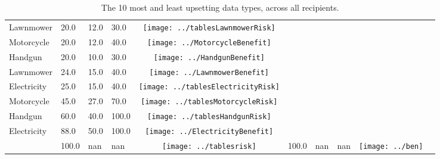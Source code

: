 \begin{table}[t]
\begin{center}
\begin{tabular}{| p{2cm} | p{1cm} | p{1cm} | p{1cm} | c | p{2cm} | p{1cm} | p{1cm} | p{1cm} | c |}
Lawnmower & 20.0 & 12.0 & 30.0 & \texttt{[image: ../tablesLawnmowerRisk]} \\ 
Motorcycle & 20.0 & 12.0 & 40.0 & \texttt{[image: ../MotorcycleBenefit]} \\ 
Handgun & 20.0 & 10.0 & 30.0 & \texttt{[image: ../HandgunBenefit]} \\ 
Lawnmower & 24.0 & 15.0 & 40.0 & \texttt{[image: ../LawnmowerBenefit]} \\ 
Electricity & 25.0 & 15.0 & 40.0 & \texttt{[image: ../tablesElectricityRisk]} \\ 
Motorcycle & 45.0 & 27.0 & 70.0 & \texttt{[image: ../tablesMotorcycleRisk]} \\ 
Handgun & 60.0 & 40.0 & 100.0 & \texttt{[image: ../tablesHandgunRisk]} \\ 
Electricity & 88.0 & 50.0 & 100.0 & \texttt{[image: ../ElectricityBenefit]} \\ 
 & 100.0 & nan & nan & \texttt{[image: ../tablesrisk]} & 100.0 & nan & nan & \texttt{[image: ../ben]} \\ 
\hline
\end{tabular}
\caption{The 10 most and least upsetting data types, across all recipients.}
\label{top10}
\end{center}
\end{table}
